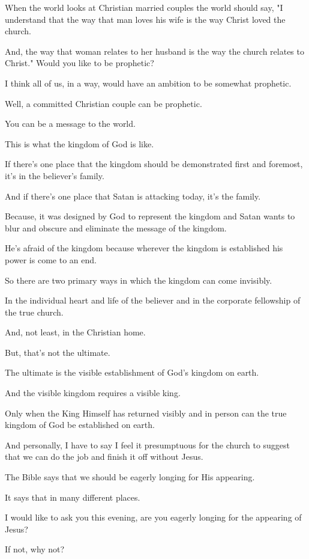 \documentclass[11pt]{article}
\begin{document}
When the world looks at Christian married
couples the world should say, "I understand
that the way that man loves his wife is the
way Christ loved the church.

And, the way that woman relates to her husband
is the way the church relates to Christ."
Would you like to be prophetic?

I think all of us, in a way, would have an
ambition to be somewhat prophetic.

Well, a committed Christian couple can be
prophetic.

You can be a message to the world.

This is what the kingdom of God is like.

If there's one place that the kingdom should
be demonstrated first and foremost, it's in
the believer's family.

And if there's one place that Satan is
attacking today, it's the family.

Because, it was designed by God to represent
the kingdom and Satan wants to blur and
obscure and eliminate the message of the
kingdom.

He's afraid of the kingdom because wherever
the kingdom is established his power is come
to an end.

So there are two primary ways in which the
kingdom can come invisibly.

In the individual heart and life of the
believer and in the corporate fellowship of
the true church.

And, not least, in the Christian home.

But, that's not the ultimate.

The ultimate is the visible establishment of
God's kingdom on earth.

And the visible kingdom requires a visible
king.

Only when the King Himself has returned
visibly and in person can the true kingdom of
God be established on earth.

And personally, I have to say I feel it
presumptuous for the church to suggest that we
can do the job and finish it off without
Jesus.

The Bible says that we should be eagerly
longing for His appearing.

It says that in many different places.

I would like to ask you this evening, are you
eagerly longing for the appearing of Jesus?

If not, why not?
\end{document}
